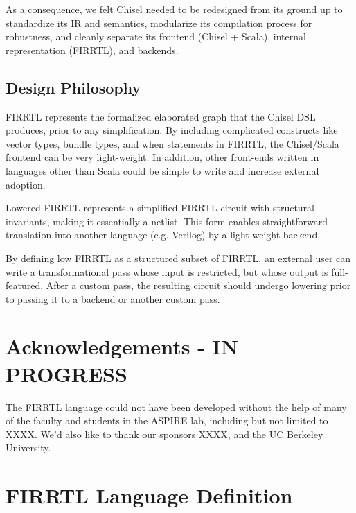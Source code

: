 \documentclass[12pt]{article}
\begin{document}
As a consequence, we felt Chisel needed to be redesigned from its ground up to standardize its IR and semantics, modularize its compilation process for robustness, and cleanly separate its frontend (Chisel + Scala), internal representation (FIRRTL), and backends.

\subsection{Design Philosophy}
FIRRTL represents the formalized elaborated graph that the Chisel DSL produces, prior to any simplification.
By including complicated constructs like vector types, bundle types, and when statements in FIRRTL, the Chisel/Scala frontend can be very light-weight.
In addition, other front-ends written in languages other than Scala could be simple to write and increase external adoption.

Lowered FIRRTL represents a simplified FIRRTL circuit with structural invariants, making it essentially a netlist.
This form enables straightforward translation into another language (e.g. Verilog) by a light-weight backend.

By defining low FIRRTL as a structured subset of FIRRTL, an external user can write a transformational pass whose input is restricted, but whose output is full-featured.
After a custom pass, the resulting circuit should undergo lowering prior to passing it to a backend or another custom pass.

\section{Acknowledgements - IN PROGRESS}
The FIRRTL language could not have been developed without the help of many of the faculty and students in the ASPIRE lab, including but not limited to XXXX.
We'd also like to thank our sponsors XXXX, and the UC Berkeley University.

\section{FIRRTL Language Definition}
\end{document}
